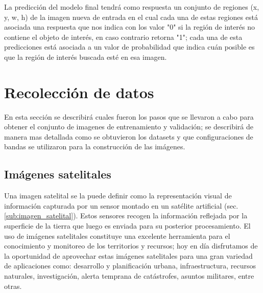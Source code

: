 La predicción del modelo final tendrá como respuesta un conjunto de regiones (x, y, w, h) de la imagen nueva de entrada en el cual cada una de estas regiones está asociada una respuesta que nos indica con los valor "0" si la región de interés no contiene el objeto de interés, en caso contrario  retorna "1"; cada una de esta predicciones está asociada a un valor de probabilidad que indica cuán posible es que la región de interés buscada esté en esa imagen.

\section{Recolección de datos}\label{sec:recoleccion}

En esta sección se describirá  cuales fueron los pasos que se llevaron a cabo para obtener el conjunto de imagenes de entrenamiento y validación; se   describirá de manera mas detallada como se obtuvieron los datasets y que configuraciones de bandas se utilizaron para la construcción de las imágenes.


\subsection{Imágenes satelitales}\label{sub:nivelesdeprocesamiento}

Una imagen satelital se la puede definir como la representación visual de información capturada por un sensor montado en un satélite artificial (sec. \ref{sub:imagen_satelital}). Estos sensores recogen la información reflejada por la superficie de la tierra que luego es enviada para su posterior procesamiento. El uso de imágenes satelitales constituye una excelente herramienta para el conocimiento y monitoreo de los territorios y recursos; hoy en día disfrutamos de la oportunidad de aprovechar estas imágenes satelitales para una gran variedad de aplicaciones como: desarrollo y planificación urbana, infraestructura, recursos naturales, investigación, alerta temprana de catástrofes, asuntos militares, entre otras.

